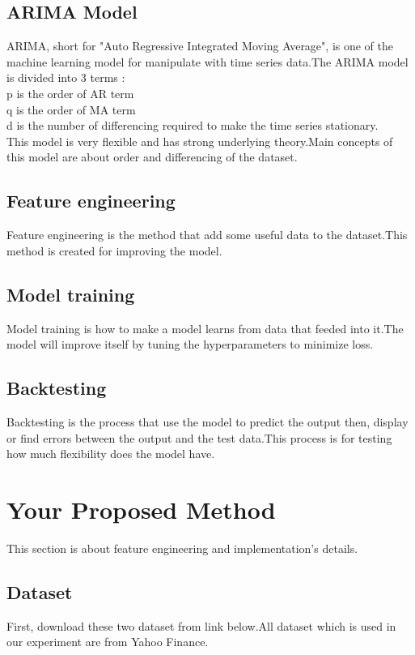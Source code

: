 \documentclass{article}
\begin{document}
\subsection{ARIMA Model}
ARIMA, short for "Auto Regressive Integrated Moving Average", is one of the machine learning model for manipulate with time series data.The ARIMA model is divided into 3 terms :\\p is the order of AR term\\q is the order of MA term\\d is the number of differencing required to make the time series stationary.\\This model is very flexible and has strong underlying theory.Main concepts of this model are about order and differencing of the dataset. 

\subsection{Feature engineering}
Feature engineering is the method that add some useful data to the dataset.This method is created for improving the model.

\subsection{Model training}
Model training is how to make a model learns from data that feeded into it.The model will improve itself by tuning the hyperparameters to minimize loss.

\subsection{Backtesting}
Backtesting is the process that use the model to predict the output then, display or find errors between the output and the test data.This process is for testing how much flexibility does the model have. 

\section{Your Proposed Method}\label{sec:yourmethod}
This section is about feature engineering and implementation's details.

\subsection{Dataset}
First, download these two dataset from link below.All dataset which is used in our experiment are from Yahoo Finance.
\end{document}
